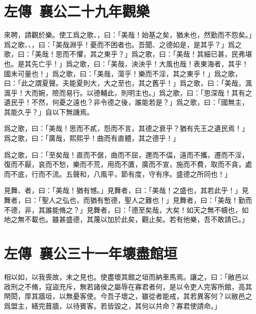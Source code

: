 \theendnotes

\section[季札觀周樂\quad{\small 左傳 襄公二十九年}]{{\normalsize 左傳\ 襄公二十九年}\quad {}觀樂}
來聘，請觀於樂。使工爲之歌、，曰：「美哉！始基之矣，猶未也，然勤而不怨矣。」爲之歌、、，曰：「美哉淵乎！憂而不困者也。吾聞、之德如是，是其乎？」爲之歌，曰：「美哉！思而不懼，其之東乎？」爲之歌，曰：「美哉！其細已甚，民弗堪也。是其先亡乎！」爲之歌，曰：「美哉，泱泱乎！大風也哉！表東海者，其乎！國未可量也！」爲之歌，曰：「美哉，蕩乎！樂而不淫，其之東乎！」爲之歌，曰：「此之謂夏聲。夫能夏則大，大之至也，其之舊乎！」爲之歌，曰：「美哉，渢渢乎！大而婉，險而易行。以德輔此，則明主也。」爲之歌，曰：「思深哉！其有之遺民乎！不然，何憂之遠也？非令德之後，誰能若是？」爲之歌，曰：「國無主，其能久乎？」自以下無譏焉。

爲之歌，曰：「美哉！思而不貳，怨而不言，其德之衰乎？猶有先王之遺民焉！」爲之歌，曰：「廣哉，熙熙乎！曲而有直體，其之德乎！」

爲之歌，曰：「至矣哉！直而不倨，曲而不屈，邇而不偪，遠而不攜，遷而不淫，復而不厭，哀而不愁，樂而不荒，用而不匱，廣而不宣，施而不費，取而不貪，處而不底，行而不流。五聲和，八風平，節有度，守有序。盛德之所同也！」

見舞、者，曰：「美哉！猶有憾。」見舞者，曰：「美哉！之盛也，其若此乎！」見舞者，曰：「聖人之弘也，而猶有慙德，聖人之難也！」見舞者，曰：「美哉！勤而不德，非，其誰能脩之？」見舞者，曰：「德至矣哉，大矣！如天之無不幬也，如地之無不載也。雖甚盛德，其蔑以加於此矣，觀止矣。若有他樂，吾不敢請已。」

\theendnotes 

\section[子產壞盡館垣\quad{\small 左傳\ 襄公三十一年}]{{\normalsize 左傳\ 襄公三十一年}\quad {}壞盡館垣}
相以如，以我喪故，未之見也。使盡壞其館之垣而納車馬焉。讓之，曰：「敝邑以政刑之不脩，寇盜充斥，無若諸侯之屬辱在寡君者何，是以令吏人完客所館，高其閈閎，厚其牆垣，以無憂客使。今吾子壞之，雖從者能戒，其若異客何？以敝邑之爲盟主，繕完葺牆，以待賓客。若皆毀之，其何以共命？寡君使請命。」

